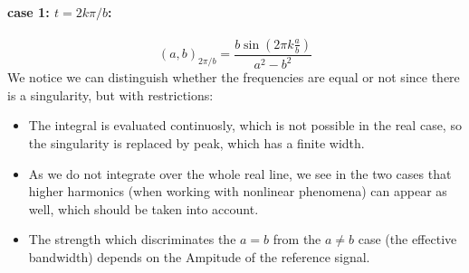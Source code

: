 \paragraph{case 1: $t = 2k\pi /b$:}
\begin{equation}
    (a,b)_{2\pi /b} = \frac{b \sin(2\pi k\frac{a}{b})}{a^2 - b^2}
\end{equation}
We notice we can distinguish whether the frequencies are equal or not 
since there is a singularity, but with restrictions:
\begin{itemize}
    \item The integral is evaluated continuosly, which is not possible
        in the real case, so the singularity is replaced by peak, which
        has a finite width.
\item As we do not integrate over the whole real line, we see in the two
    cases that higher harmonics (when working with nonlinear phenomena)
    can appear as well, which should be taken into account.
\item The strength which discriminates the $a=b$ from the $a\neq b$ case
    (the effective bandwidth)
    depends on the Ampitude of the reference signal. 
\end{itemize}


